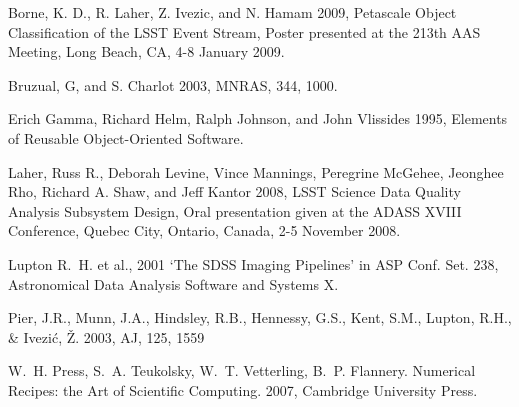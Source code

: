 \begin{thebibliography}{}

 Borne, K. D., R. Laher, Z. Ivezic, and N. Hamam 2009,
   Petascale Object Classification of the LSST Event Stream, 
   Poster presented at the 213th AAS Meeting, Long Beach, CA, 4-8
   January 2009.

 Bruzual, G, and
  S. Charlot 2003, MNRAS, 344, 1000.

Erich Gamma, Richard Helm, Ralph Johnson, and John Vlissides 1995,
Elements of Reusable Object-Oriented Software.

 Laher, Russ R., Deborah Levine, Vince Mannings, 
   Peregrine McGehee, Jeonghee Rho, Richard A. Shaw, and Jeff Kantor 2008,
   LSST Science Data Quality Analysis Subsystem Design,
   Oral presentation given at the ADASS XVIII Conference, Quebec City, Ontario, Canada, 
   2-5 November 2008.

Lupton R.~H. et al., 2001 `The SDSS Imaging Pipelines' in
ASP Conf. Set. 238, Astronomical Data Analysis Software and Systems X.
   
 Pier, J.R., Munn, J.A., Hindsley, R.B., Hennessy, G.S.,
Kent, S.M., Lupton, R.H., \& Ivezi\'c, \v{Z}. 2003, AJ, 125, 1559

  W.~H. Press,  S.~A. Teukolsky, W.~T. Vetterling, B.~P. Flannery.
  Numerical Recipes: the Art of Scientific Computing.
  2007, Cambridge University Press.
   
\end{thebibliography}
